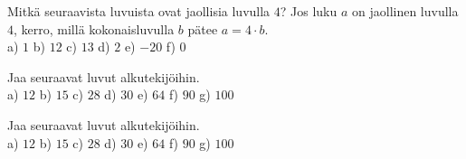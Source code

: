 \begin{tehtavasivu}
    \begin{tehtava}
    Mitkä seuraavista luvuista ovat jaollisia luvulla $4$? Jos luku $a$ on jaollinen luvulla $4$, kerro, millä kokonaisluvulla $b$ pätee $a = 4 \cdot b$.\\
    a) $1$ \quad b) $12$  \quad c) $13$ \quad d) $2$ \quad e) $-20$ \quad f) $0$
    
    \begin{vastaus}
    \begin{alakohdat}
    \end{alakohdat}
    \end{vastaus}
    \end{tehtava}

\begin{tehtava}
    Jaa seuraavat luvut alkutekijöihin.\\
    a) $12$ \quad b) $15$ \quad c) $28$ \quad d) $30$ \quad e) $64$ \quad f) $90$ \quad g) $100$
    
    \begin{vastaus}
    \begin{alakohdat}
    \end{alakohdat}
    \end{vastaus}
    \end{tehtava}

    \begin{tehtava}
    Jaa seuraavat luvut alkutekijöihin.\\
    a) $12$ \quad b) $15$ \quad c) $28$ \quad d) $30$ \quad e) $64$ \quad f) $90$ \quad g) $100$
    
    \begin{vastaus}
    \begin{alakohdat}
    \end{alakohdat}
    \end{vastaus}
    \end{tehtava}
\end{tehtavasivu}
